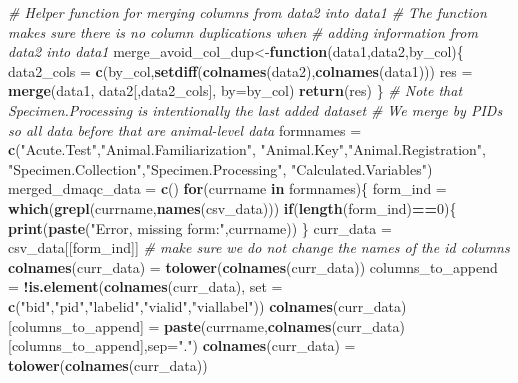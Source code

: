\documentclass[]{article}
\newenvironment{Shaded}{\begin{snugshade}}{\end{snugshade}}
\newcommand{\KeywordTok}[1]{\textcolor[rgb]{0.13,0.29,0.53}{\textbf{#1}}}
\newcommand{\DataTypeTok}[1]{\textcolor[rgb]{0.13,0.29,0.53}{#1}}
\newcommand{\DecValTok}[1]{\textcolor[rgb]{0.00,0.00,0.81}{#1}}
\newcommand{\StringTok}[1]{\textcolor[rgb]{0.31,0.60,0.02}{#1}}
\newcommand{\CommentTok}[1]{\textcolor[rgb]{0.56,0.35,0.01}{\textit{#1}}}
\newcommand{\ControlFlowTok}[1]{\textcolor[rgb]{0.13,0.29,0.53}{\textbf{#1}}}
\newcommand{\OperatorTok}[1]{\textcolor[rgb]{0.81,0.36,0.00}{\textbf{#1}}}
\newcommand{\NormalTok}[1]{#1}
\begin{document}
\begin{Shaded}
\begin{Highlighting}[]
\CommentTok{# Helper function for merging columns from data2 into data1}
\CommentTok{# The function makes sure there is no column duplications when}
\CommentTok{# adding information from data2 into data1}
\NormalTok{merge_avoid_col_dup<-}\ControlFlowTok{function}\NormalTok{(data1,data2,by_col)\{}
\NormalTok{  data2_cols =}\StringTok{ }\KeywordTok{c}\NormalTok{(by_col,}\KeywordTok{setdiff}\NormalTok{(}\KeywordTok{colnames}\NormalTok{(data2),}\KeywordTok{colnames}\NormalTok{(data1)))}
\NormalTok{  res =}\StringTok{ }\KeywordTok{merge}\NormalTok{(data1, data2[,data2_cols], }\DataTypeTok{by=}\NormalTok{by_col)}
  \KeywordTok{return}\NormalTok{(res)}
\NormalTok{\}}
\CommentTok{# Note that Specimen.Processing is intentionally the last added dataset}
\CommentTok{# We merge by PIDs so all data before that are animal-level data}
\NormalTok{formnames =}\StringTok{ }\KeywordTok{c}\NormalTok{(}\StringTok{"Acute.Test"}\NormalTok{,}\StringTok{"Animal.Familiarization"}\NormalTok{,}
              \StringTok{"Animal.Key"}\NormalTok{,}\StringTok{"Animal.Registration"}\NormalTok{,}
              \StringTok{"Specimen.Collection"}\NormalTok{,}\StringTok{"Specimen.Processing"}\NormalTok{,}
              \StringTok{"Calculated.Variables"}\NormalTok{)}
\NormalTok{merged_dmaqc_data =}\StringTok{ }\KeywordTok{c}\NormalTok{()}
\ControlFlowTok{for}\NormalTok{(currname }\ControlFlowTok{in}\NormalTok{ formnames)\{}
\NormalTok{  form_ind =}\StringTok{ }\KeywordTok{which}\NormalTok{(}\KeywordTok{grepl}\NormalTok{(currname,}\KeywordTok{names}\NormalTok{(csv_data)))}
  \ControlFlowTok{if}\NormalTok{(}\KeywordTok{length}\NormalTok{(form_ind)}\OperatorTok{==}\DecValTok{0}\NormalTok{)\{}
    \KeywordTok{print}\NormalTok{(}\KeywordTok{paste}\NormalTok{(}\StringTok{"Error, missing form:"}\NormalTok{,currname))}
\NormalTok{  \}}
\NormalTok{  curr_data =}\StringTok{ }\NormalTok{csv_data[[form_ind]]}
  \CommentTok{# make sure we do not change the names of the id columns}
  \KeywordTok{colnames}\NormalTok{(curr_data) =}\StringTok{ }\KeywordTok{tolower}\NormalTok{(}\KeywordTok{colnames}\NormalTok{(curr_data))}
\NormalTok{  columns_to_append =}\StringTok{ }\OperatorTok{!}\KeywordTok{is.element}\NormalTok{(}\KeywordTok{colnames}\NormalTok{(curr_data),}
              \DataTypeTok{set =} \KeywordTok{c}\NormalTok{(}\StringTok{"bid"}\NormalTok{,}\StringTok{"pid"}\NormalTok{,}\StringTok{"labelid"}\NormalTok{,}\StringTok{"vialid"}\NormalTok{,}\StringTok{"viallabel"}\NormalTok{))}
  \KeywordTok{colnames}\NormalTok{(curr_data)[columns_to_append] =}\StringTok{ }
\StringTok{    }\KeywordTok{paste}\NormalTok{(currname,}\KeywordTok{colnames}\NormalTok{(curr_data)[columns_to_append],}\DataTypeTok{sep=}\StringTok{"."}\NormalTok{)}
  \KeywordTok{colnames}\NormalTok{(curr_data) =}\StringTok{ }\KeywordTok{tolower}\NormalTok{(}\KeywordTok{colnames}\NormalTok{(curr_data))}


\end{Highlighting}
\end{Shaded}
\end{document}
